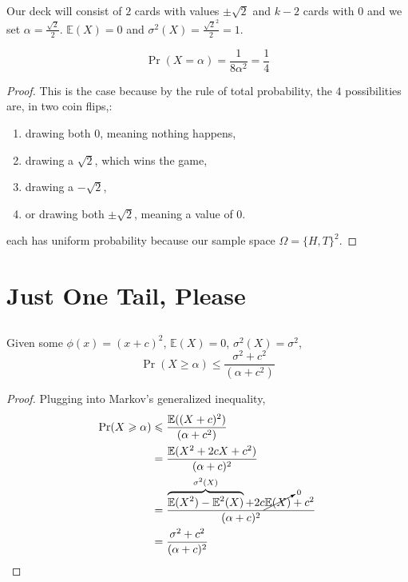 \documentclass{article}
\newcommand{\E}{\mathbb{E}}
\begin{document}
Our deck will consist of \(2\) cards with values \(\pm \sqrt{2}\) and \(k - 2\) cards with \(0\) and we set \(\alpha = \frac{\sqrt{2}}{2}\).
\(\E(X) = 0\) and \(\sigma^2(X) = \frac{\sqrt{2}^2}{2} = 1\).
\begin{theorem}
    \begin{equation}
        \Pr(X = \alpha) = \frac{1}{8 \alpha^2} = \frac{1}{4}
    \end{equation}
\end{theorem}
\begin{proof}
    This is the case because by the rule of total probability, the \(4\) possibilities are, in two coin flips,:
    \begin{enumerate}
        \item drawing both \(0\), meaning nothing happens,
        \item drawing a \(\sqrt{2}\), which wins the game,
        \item drawing a \(-\sqrt{2}\),
        \item or drawing both \(\pm \sqrt{2}\), meaning a value of \(0\).
    \end{enumerate}
    each has uniform probability because our sample space \(\Omega = \{H, T\}^2\).
\end{proof}

\section{Just One Tail, Please}

\subsection{}

\begin{theorem}
    Given some \(\phi(x) = (x + c)^2\), \(\E(X) = 0\), \(\sigma^2(X) = \sigma^2\),
    \begin{equation}
        \Pr(X \geqslant \alpha) \leqslant \frac{\sigma^2 + c^2}{(\alpha + c^2)}
    \end{equation}
\end{theorem}
\begin{proof}
    Plugging into Markov's generalized inequality,
    \begin{align}
        \Pr(X \geqslant \alpha) &\leqslant \frac{\E((X + c)^2)}{(\alpha + c^2)} \\
        &= \frac{\E(X^2 + 2cX + c^2)}{(\alpha + c)^2} \\
        &= \frac{\overbrace{\E(X^2) - \E^2(X)}^{\sigma^2(X)} + 2c\cancelto{0}{\E(X)} + c^2}{(\alpha + c)^2} \\
        &= \frac{\sigma^2 + c^2}{(\alpha + c)^2}
    \end{align}
\end{proof}
\end{document}
